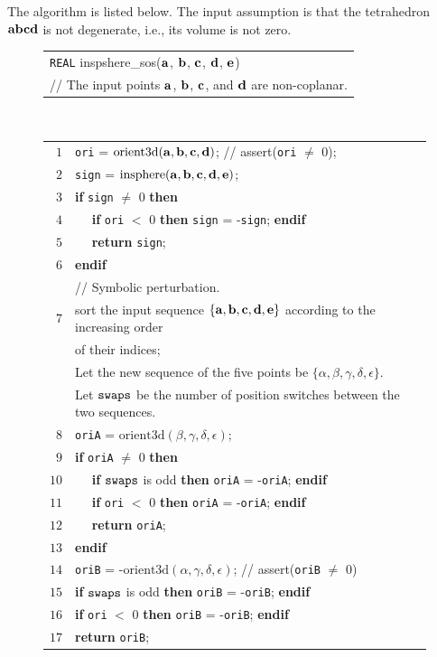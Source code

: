 The algorithm is listed below. The input assumption is that the tetrahedron ${\bf abcd}$ is not degenerate, i.e., its volume is not zero.

\begin{figure}[h]
\begin{tabular}{l}
{\tt REAL} {\sc inspshere\_sos}(${\bf a}$, ${\bf b}$, ${\bf c}$, ${\bf d}$, ${\bf e}$)\\
// The input points ${\bf a}$, ${\bf b}$, ${\bf c}$, and ${\bf d}$ are non-coplanar.
\end{tabular}\\
\begin{tabular}{rl}
$1$ & {\tt ori} = $\textrm{orient3d}({\bf a}, {\bf b}, {\bf c}, {\bf d})$; // assert({\tt ori} $\neq$ 0);\\ 
$2$ & {\tt sign} = $\textrm{insphere}({\bf a}, {\bf b}, {\bf c}, {\bf d}, {\bf e})$;\\
$3$ & {\bf if} {\tt sign} $\neq$ 0 {\bf then}\\
$4$ & $\quad$ {\bf if} {\tt ori} $<$ 0 {\bf then} {\tt sign} = -{\tt sign}; {\bf endif}\\
$5$ & $\quad$ {\bf return} {\tt sign};\\
$6$ & {\bf endif}\\
 & // Symbolic perturbation.\\
$7$ & sort the input sequence $\{ {\bf a}, {\bf b}, {\bf c}, {\bf d}, {\bf e}\}$ according to  the increasing order\\
 & of their indices;\\
 & Let the new sequence of the five points be $\{\alpha, \beta, \gamma, \delta, \epsilon\}$.\\
 & Let ${\tt swaps}$ be the number of position switches between the two sequences.\\
$8$ & {\tt oriA} = $\textrm{orient3d}(\beta, \gamma, \delta, \epsilon)$;\\
$9$ & {\bf if} {\tt oriA} $\neq$ 0 {\bf then}\\
$10$ & $\quad$ {\bf if} ${\tt swaps}$ is odd {\bf then} {\tt oriA} = -{\tt oriA}; {\bf endif}\\
$11$ & $\quad$ {\bf if} {\tt ori} $<$ 0 {\bf then} {\tt oriA} = -{\tt oriA}; {\bf endif}\\
$12$ & $\quad$ {\bf return} {\tt oriA};\\
$13$ & {\bf endif}\\
$14$ & {\tt oriB} = -$\textrm{orient3d}(\alpha, \gamma, \delta, \epsilon)$; // assert({\tt oriB} $\neq$ 0)\\
$15$ & {\bf if} ${\tt swaps}$ is odd {\bf then} {\tt oriB} = -{\tt oriB}; {\bf endif}\\
$16$ & {\bf if} {\tt ori} $<$ 0 {\bf then} {\tt oriB} = -{\tt oriB}; {\bf endif}\\
$17$ & {\bf return} {\tt oriB};\\
\end{tabular}
\end{figure}

